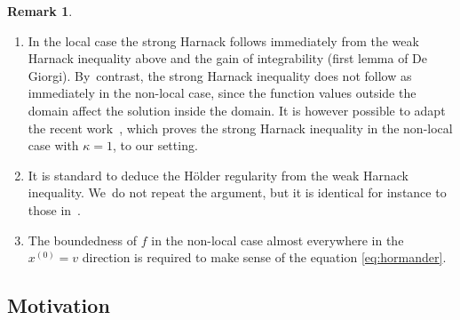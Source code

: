 \documentclass[JEP,XML,SOM,Unicode,NoFloatCountersInSection,published]{cedram}
\theoremstyle{definition}
\newtheorem{remark}[theorem]{Remark}
\begin{document}
\pagebreak[2]
\skpt
\begin{remark}
\begin{enumerate}
\item In the local case the strong Harnack follows immediately
from the weak Harnack inequality above and the gain of
integrability (first lemma of De Giorgi). By~contrast, the
strong Harnack inequality does not follow as immediately in
the non-local case, since the function values outside the
domain affect the solution inside the domain. It is however
possible to adapt the recent work~\cite{APP, Loher-2023, Loher-2024}, which
proves the strong Harnack inequality in the non-local case
with $\kappa = 1$, to our setting.
\item It is standard to deduce the Hölder regularity from the
weak Harnack inequality. We~do not repeat the argument, but it
is identical for instance to those
in~\cite{guerand-mouhot,loher-2022-preprint-quantitative-de-giorgi}.
\item The boundedness of $f$ in the non-local case almost everywhere in the $x^{(0)}=v$ direction is required to make sense of the equation \eqref{eq:hormander}.
\end{enumerate}
\end{remark}

\subsection{Motivation}
\label{sub-motivation}
\end{document}
